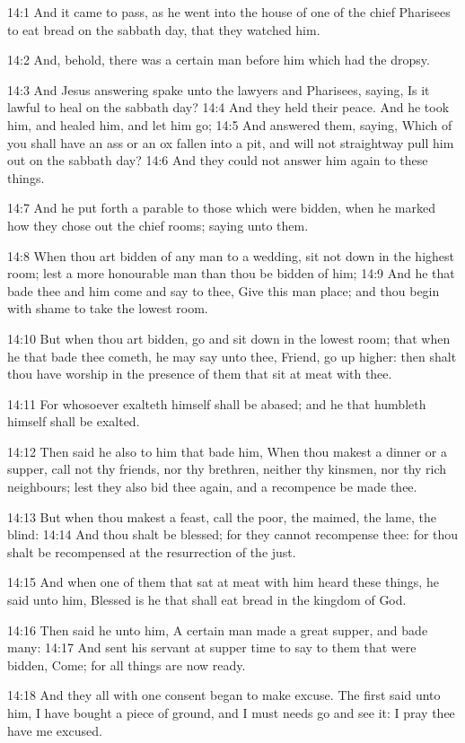 14:1 And it came to pass, as he went into the house of one of the chief Pharisees to eat bread on the sabbath day, that they watched him.

14:2 And, behold, there was a certain man before him which had the dropsy.

14:3 And Jesus answering spake unto the lawyers and Pharisees, saying, Is it lawful to heal on the sabbath day?  14:4 And they held their peace. And he took him, and healed him, and let him go; 14:5 And answered them, saying, Which of you shall have an ass or an ox fallen into a pit, and will not straightway pull him out on the sabbath day?  14:6 And they could not answer him again to these things.

14:7 And he put forth a parable to those which were bidden, when he marked how they chose out the chief rooms; saying unto them.

14:8 When thou art bidden of any man to a wedding, sit not down in the highest room; lest a more honourable man than thou be bidden of him; 14:9 And he that bade thee and him come and say to thee, Give this man place; and thou begin with shame to take the lowest room.

14:10 But when thou art bidden, go and sit down in the lowest room; that when he that bade thee cometh, he may say unto thee, Friend, go up higher: then shalt thou have worship in the presence of them that sit at meat with thee.

14:11 For whosoever exalteth himself shall be abased; and he that humbleth himself shall be exalted.

14:12 Then said he also to him that bade him, When thou makest a dinner or a supper, call not thy friends, nor thy brethren, neither thy kinsmen, nor thy rich neighbours; lest they also bid thee again, and a recompence be made thee.

14:13 But when thou makest a feast, call the poor, the maimed, the lame, the blind: 14:14 And thou shalt be blessed; for they cannot recompense thee: for thou shalt be recompensed at the resurrection of the just.

14:15 And when one of them that sat at meat with him heard these things, he said unto him, Blessed is he that shall eat bread in the kingdom of God.

14:16 Then said he unto him, A certain man made a great supper, and bade many: 14:17 And sent his servant at supper time to say to them that were bidden, Come; for all things are now ready.

14:18 And they all with one consent began to make excuse. The first said unto him, I have bought a piece of ground, and I must needs go and see it: I pray thee have me excused.

